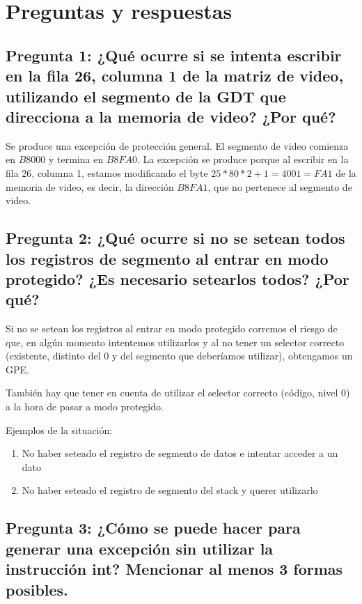 \documentclass[a4paper,10pt,twoside]{article}
\begin{document}


\section{Preguntas y respuestas}


\subsection{Pregunta 1: ¿Qué ocurre si se intenta escribir en la fila 26, columna 1 de la matriz de video, utilizando el segmento de la GDT que direcciona a la memoria de video? ¿Por qué?}

Se produce una excepción de protección general. El segmento de video comienza en $B8000$ y termina en $B8FA0$. La excepción se produce porque al escribir en la fila 26, columna 1, estamos modificando el byte $25 * 80 * 2 + 1 = 4001 = FA1$ de la memoria de video, es decir, la dirección $B8FA1$, que no pertenece al segmento de video.

\subsection{Pregunta 2: ¿Qué ocurre si no se setean todos los registros de segmento al entrar en
modo protegido? ¿Es necesario setearlos todos? ¿Por qué?}
Si no se setean los registros al entrar en modo protegido corremos el riesgo de que, en algún momento intentemos utilizarlos y al no tener un selector correcto (existente, distinto del 0 y del segmento que deberíamos utilizar), obtengamos un GPE.

También hay que tener en cuenta de utilizar el selector correcto (código, nivel 0) a la hora de pasar a modo protegido.

Ejemplos de la situación:

\begin{enumerate}
	\item No haber seteado el registro de segmento de datos e intentar acceder a un dato
	\item No haber seteado el registro de segmento del stack y querer utilizarlo
\end{enumerate}


\subsection{Pregunta 3: ¿Cómo se puede hacer para generar una excepción sin utilizar la instrucción int? Mencionar al menos 3 formas posibles.}
\end{document}
